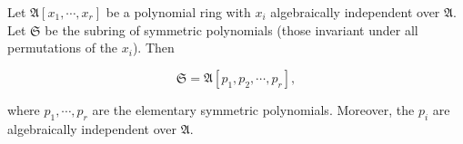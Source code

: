 Let $\mathfrak{A}[x_1, \cdots, x_r]$ be a polynomial ring with $x_i$ algebraically independent over $\mathfrak{A}$. Let $\mathfrak{S}$ be the subring of symmetric polynomials (those invariant under all permutations of the $x_i$). Then

$$\mathfrak{S} = \mathfrak{A}[p_1, p_2, \cdots, p_r],$$

where $p_1, \cdots, p_r$ are the elementary symmetric polynomials. Moreover, the $p_i$ are algebraically independent over $\mathfrak{A}$.
